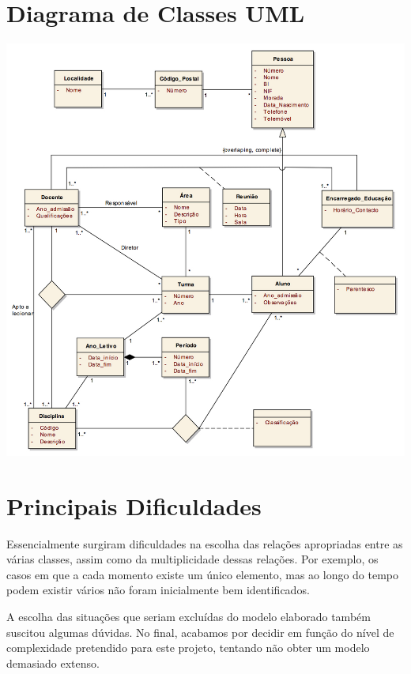 \documentclass[12pt,a4paper,reqno]{report}
\numberwithin{figure}{section}
\numberwithin{equation}{section}
\begin{document}
\chapter{Diagrama de Classes UML}

\begin{center}

\includegraphics[width=15cm]{UML.jpg}

\end{center}

\chapter{Principais Dificuldades}

Essencialmente surgiram dificuldades na escolha das relações apropriadas entre as várias classes, assim como da multiplicidade dessas relações. Por exemplo, os casos em que a cada momento existe um único elemento, mas ao longo do tempo podem existir vários não foram inicialmente bem identificados.

A escolha das situações que seriam excluídas do modelo elaborado também suscitou algumas dúvidas. No final, acabamos por decidir em função do nível de complexidade pretendido para este projeto, tentando não obter um modelo demasiado extenso.
\end{document}
